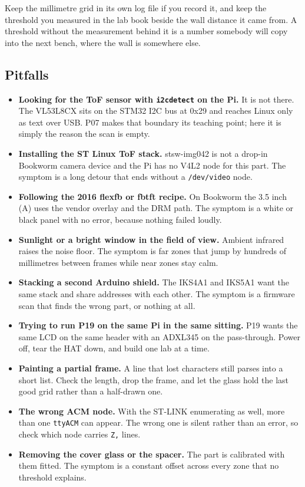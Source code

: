 Keep the millimetre grid in its own log file if you record it, and keep the threshold you
measured in the lab book beside the wall distance it came from. A threshold without the
measurement behind it is a number somebody will copy into the next bench, where the wall
is somewhere else.

\subsection*{Pitfalls}

\begin{itemize}
\item \textbf{Looking for the ToF sensor with \texttt{i2cdetect} on the Pi.} It is not
there. The VL53L8CX sits on the STM32 I2C bus at 0x29 and reaches Linux only as text over
USB. P07 makes that boundary its teaching point; here it is simply the reason the scan is
empty.
\item \textbf{Installing the ST Linux ToF stack.} stsw-img042 is not a drop-in Bookworm
camera device and the Pi has no V4L2 node for this part. The symptom is a long detour that
ends without a \texttt{/dev/video} node.
\item \textbf{Following the 2016 flexfb or fbtft recipe.} On Bookworm the 3.5 inch (A) uses
the vendor overlay and the DRM path. The symptom is a white or black panel with no error,
because nothing failed loudly.
\item \textbf{Sunlight or a bright window in the field of view.} Ambient infrared raises
the noise floor. The symptom is far zones that jump by hundreds of millimetres between
frames while near zones stay calm.
\item \textbf{Stacking a second Arduino shield.} The IKS4A1 and IKS5A1 want the same stack
and share addresses with each other. The symptom is a firmware scan that finds the wrong
part, or nothing at all.
\item \textbf{Trying to run P19 on the same Pi in the same sitting.} P19 wants the same LCD
on the same header with an ADXL345 on the pass-through. Power off, tear the HAT down, and
build one lab at a time.
\item \textbf{Painting a partial frame.} A line that lost characters still parses into a
short list. Check the length, drop the frame, and let the glass hold the last good grid
rather than a half-drawn one.
\item \textbf{The wrong ACM node.} With the ST-LINK enumerating as well, more than one
\texttt{ttyACM} can appear. The wrong one is silent rather than an error, so check which
node carries \texttt{Z,} lines.
\item \textbf{Removing the cover glass or the spacer.} The part is calibrated with them
fitted. The symptom is a constant offset across every zone that no threshold explains.
\end{itemize}

